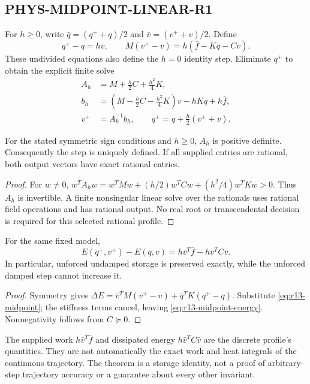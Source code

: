 \subsection{PHYS-MIDPOINT-LINEAR-R1}
For $h\ge0$, write $\bar q=(q^++q)/2$ and $\bar v=(v^++v)/2$. Define
\begin{equation}
 q^+-q=h\bar v,\qquad
 M(v^+-v)=h(\bar f-K\bar q-C\bar v).
 \label{eq:r13-midpoint}
\end{equation}
These undivided equations also define the $h=0$ identity step. Eliminate
$q^+$ to obtain the explicit finite solve
\begin{align}
 A_h&=M+\tfrac h2C+\tfrac{h^2}{4}K,\\
 b_h&=(M-\tfrac h2C-\tfrac{h^2}{4}K)v-hKq+h\bar f,\\
 v^+&=A_h^{-1}b_h,\qquad q^+=q+\tfrac h2(v^++v).
 \label{eq:r13-midpoint-solve}
\end{align}
\begin{proposition}
For the stated symmetric sign conditions and $h\ge0$, $A_h$ is positive
definite. Consequently the step is uniquely defined. If all supplied entries
are rational, both output vectors have exact rational entries.
\end{proposition}
\begin{proof}
For $w\ne0$, $w^TA_hw=w^TMw+(h/2)w^TCw+(h^2/4)w^TKw>0$.
Thus $A_h$ is invertible. A finite nonsingular linear solve over the rationals
uses rational field operations and has rational output. No real root or
transcendental decision is required for this selected rational profile.
\end{proof}

\begin{proposition}
For the same fixed model,
\begin{equation}
 E(q^+,v^+)-E(q,v)
       =h\bar v^T\bar f-h\bar v^TC\bar v.
 \label{eq:r13-midpoint-energy}
\end{equation}
In particular, unforced undamped storage is preserved exactly, while the
unforced damped step cannot increase it.
\end{proposition}
\begin{proof}
Symmetry gives
$\Delta E=\bar v^TM(v^+-v)+\bar q^TK(q^+-q)$.
Substitute \eqref{eq:r13-midpoint}; the stiffness terms cancel, leaving
\eqref{eq:r13-midpoint-energy}. Nonnegativity follows from $C\succeq0$.
\end{proof}
The supplied work $h\bar v^T\bar f$ and dissipated energy $h\bar v^TC\bar v$
are the discrete profile's quantities. They are not automatically the exact
work and heat integrals of the continuous trajectory. The theorem is a
storage identity, not a proof of arbitrary-step trajectory accuracy or a
guarantee about every other invariant.

